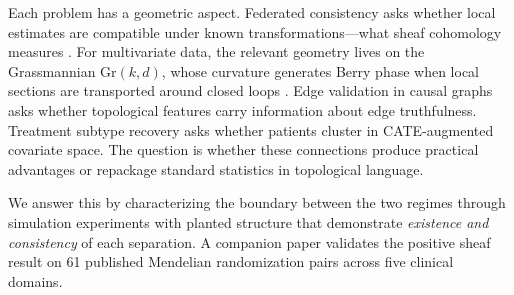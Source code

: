 \documentclass[11pt]{article}
\newcommand{\Gr}{\mathrm{Gr}}
\begin{document}
Each problem has a geometric aspect.
Federated consistency asks whether local estimates are compatible under known transformations---what sheaf cohomology measures \citep{robinson2014topological, curry2014sheaves}.
For multivariate data, the relevant geometry lives on the Grassmannian $\Gr(k,d)$, whose curvature generates Berry phase when local sections are transported around closed loops \citep{berry1984quantal, simon1983holonomy}.
Edge validation in causal graphs asks whether topological features carry information about edge truthfulness.
Treatment subtype recovery asks whether patients cluster in CATE-augmented covariate space.
The question is whether these connections produce practical advantages or repackage standard statistics in topological language.

We answer this by characterizing the boundary between the two regimes through simulation experiments with planted structure that demonstrate \emph{existence and consistency} of each separation. A companion paper \citep{tower2026sheaf} validates the positive sheaf result on 61 published Mendelian randomization pairs across five clinical domains.
\end{document}
